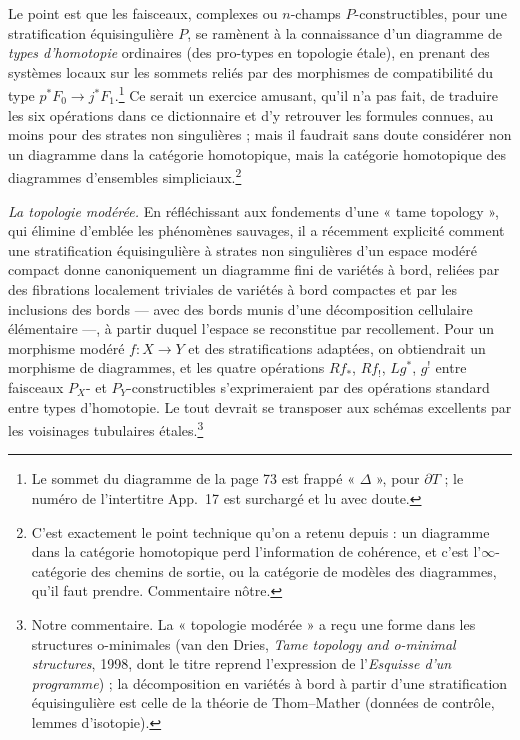 \documentclass[11pt,a4paper]{article}
\begin{document}
Le point est que les faisceaux, complexes ou $n$-champs $P$-constructibles,
pour une stratification équisingulière $P$, se ramènent à la connaissance
d'un diagramme de \emph{types d'homotopie} ordinaires (des pro-types en
topologie étale), en prenant des systèmes locaux sur les sommets reliés par
des morphismes de compatibilité du type $p^*F_0 \to j^*F_1$.\footnote{Le
sommet du diagramme de la page 73 est frappé « $\Delta$ », pour
$\partial T$ ; le numéro de l'intertitre App.~17 est surchargé et lu avec
doute.} Ce serait un exercice amusant, qu'il n'a pas fait, de traduire les
six opérations dans ce dictionnaire et d'y retrouver les formules connues,
au moins pour des strates non singulières ; mais il faudrait sans doute
considérer non un diagramme dans la catégorie homotopique, mais la catégorie
homotopique des diagrammes d'ensembles simpliciaux.\footnote{C'est
exactement le point technique qu'on a retenu depuis : un diagramme dans la
catégorie homotopique perd l'information de cohérence, et c'est
l'$\infty$-catégorie des chemins de sortie, ou la catégorie de modèles des
diagrammes, qu'il faut prendre. Commentaire nôtre.}

\emph{La topologie modérée.} En réfléchissant aux fondements d'une « tame
topology », qui élimine d'emblée les phénomènes sauvages, il a récemment
explicité comment une stratification équisingulière à strates non
singulières d'un espace modéré compact donne canoniquement un diagramme
fini de variétés à bord, reliées par des fibrations localement triviales de
variétés à bord compactes et par les inclusions des bords --- avec des bords
munis d'une décomposition cellulaire élémentaire ---, à partir duquel
l'espace se reconstitue par recollement. Pour un morphisme modéré
$f : X \to Y$ et des stratifications adaptées, on obtiendrait un morphisme
de diagrammes, et les quatre opérations $Rf_*$, $Rf_!$, $Lg^*$, $g^!$
entre faisceaux $P_X$- et $P_Y$-constructibles s'exprimeraient par des
opérations standard entre types d'homotopie. Le tout devrait se transposer
aux schémas excellents par les voisinages tubulaires étales.\footnote{Notre
commentaire. La « topologie modérée » a reçu une forme dans les structures
o-minimales (van den Dries, \emph{Tame topology and o-minimal structures},
1998, dont le titre reprend l'expression de l'\emph{Esquisse d'un
programme}) ; la décomposition en variétés à bord à partir d'une
stratification équisingulière est celle de la théorie de Thom--Mather
(données de contrôle, lemmes d'isotopie).}
\end{document}
